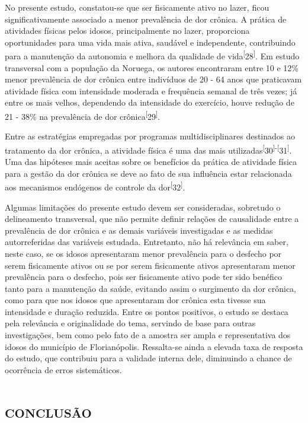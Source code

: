 \documentclass{article}
\begin{document}
No presente estudo, constatou-se que ser fisicamente ativo no lazer, ficou
significativamente associado a menor prevalência de dor crônica. A prática de
atividades físicas pelos idosos, principalmente no lazer, proporciona
oportunidades para uma vida mais ativa, saudável e independente, contribuindo
para a manutenção da autonomia e melhora da qualidade de
vida\textsuperscript{[}28\textsuperscript{]}. Em estudo transversal com a população da Noruega, os autores encontraram entre
10 e 12\% menor prevalência de dor crônica entre indivíduos de 20 - 64 anos que
praticavam atividade física com intensidade moderada e frequência semanal de
três vezes; já entre os mais velhos, dependendo da intensidade do exercício,
houve redução de 21 - 38\% na prevalência de dor
crônica\textsuperscript{[}29\textsuperscript{]}.

Entre as estratégias empregadas por programas multidisciplinares destinados ao
tratamento da dor crônica, a atividade física é uma das mais
utilizadas\textsuperscript{[}30\textsuperscript{]}\textsuperscript{-}\textsuperscript{[}31\textsuperscript{]}. Uma das hipóteses mais aceitas sobre os benefícios da prática de atividade
física para a gestão da dor crônica se deve ao fato de sua influência estar
relacionada aos mecanismos endógenos de controle da
dor\textsuperscript{[}32\textsuperscript{]}.

Algumas limitações do presente estudo devem ser consideradas, sobretudo o
delineamento transversal, que não permite definir relações de causalidade entre
a prevalência de dor crônica e as demais variáveis investigadas e as medidas
autorreferidas das variáveis estudada. Entretanto, não há relevância em saber,
neste caso, se os idosos apresentaram menor prevalência para o desfecho por
serem fisicamente ativos ou se por serem fisicamente ativos apresentaram menor
prevalência para o desfecho, pois ser fisicamente ativo pode ter sido benéfico
tanto para a manutenção da saúde, evitando assim o surgimento da dor crônica,
como para que nos idosos que apresentaram dor crônica esta tivesse sua
intensidade e duração reduzida. Entre os pontos positivos, o estudo se destaca
pela relevância e originalidade do tema, servindo de base para outras
investigações, bem como pelo fato de a amostra ser ampla e representativa dos
idosos do município de Florianópolis. Ressalta-se ainda a elevada taxa de
resposta do estudo, que contribuiu para a validade interna dele, diminuindo a
chance de ocorrência de erros sistemáticos.

\section{\textsc{conclusão}}
\end{document}
